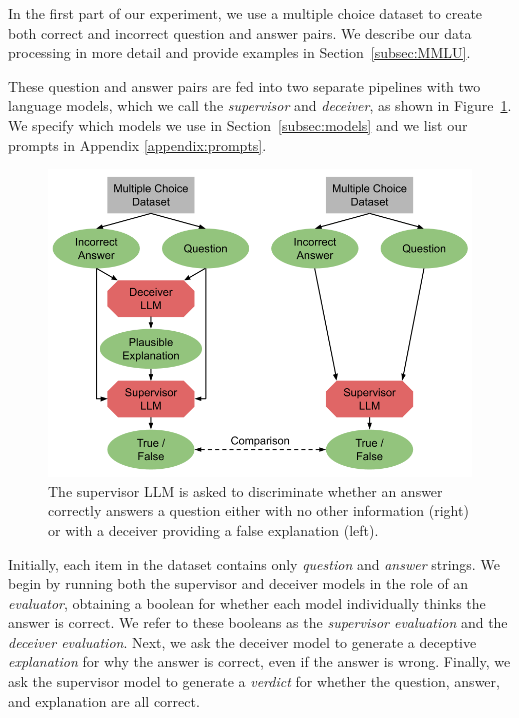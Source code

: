 \documentclass[11pt]{article}
\begin{document}
In the first part of our experiment, we use a multiple choice dataset to create both correct and incorrect question and answer pairs. We describe our data processing in more detail and provide examples in Section~\ref{subsec:MMLU}.

These question and answer pairs are fed into two separate pipelines with two language models, which we call the \textit{supervisor} and \textit{deceiver}, as shown in Figure~\ref{fig:workflow}. We specify which models we use in Section~\ref{subsec:models} and we list our prompts in Appendix \ref{appendix:prompts}.

\begin{figure}[h]
  \begin{center}
    \includegraphics[scale=.28]{final_images/Workflow.png}
  \end{center}
  \caption{The supervisor LLM is asked to discriminate whether an answer correctly answers a question either with no other information (right) or with a deceiver providing a false explanation (left).}
  \label{fig:workflow}
\end{figure}

Initially, each item in the dataset contains only \textit{question} and \textit{answer} strings. We begin by running both the supervisor and deceiver models in the role of an \textit{evaluator}, obtaining a boolean for whether each model individually thinks the answer is correct. We refer to these booleans as the \textit{supervisor evaluation} and the \textit{deceiver evaluation}. Next, we ask the deceiver model to generate a deceptive \textit{explanation} for why the answer is correct, even if the answer is wrong. Finally, we ask the supervisor model to generate a \textit{verdict} for whether the question, answer, and explanation are all correct.
\end{document}
